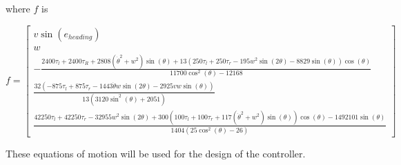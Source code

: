 \documentclass[10pt, letterbox]{article}
\begin{document}
where $f$ is\\
\begin{center}
\begin{equation}
f = 
\begin{bmatrix}v 
\sin{\left(e_{heading} \right)}\\
w\\
- \frac{2400 \tau_{l} + 2400 \tau_{R} + 2808 \left(\dot{\theta}^{2} + w^{2}\right) \sin{\left(\theta \right)} + 13 \left(250 \tau_{l} + 250 \tau_{r} - 195 w^{2} \sin{\left(2 \theta \right)} - 8829 \sin{\left(\theta \right)}\right) \cos{\left(\theta \right)}}{11700 \cos^{2}{\left(\theta \right)} - 12168}\\
\frac{32 \left(- 875 \tau_{l} + 875 \tau_{r} - 1443 \dot{\theta} w \sin{\left(2 \theta \right)} - 2925 v w \sin{\left(\theta \right)}\right)}{13 \left(3120 \sin^{2}{\left(\theta \right)} + 2051\right)}\\
\frac{42250 \tau_{l} + 42250 \tau_{r} - 32955 w^{2} \sin{\left(2 \theta \right)} + 300 \left(100 \tau_{l} + 100 \tau_{r} + 117 \left(\dot{\theta}^{2} + w^{2}\right) \sin{\left(\theta \right)}\right) \cos{\left(\theta \right)} - 1492101 \sin{\left(\theta \right)}}{1404 \left(25 \cos^{2}{\left(\theta \right)} - 26\right)}
\end{bmatrix}
\end{equation}
\end{center}
These equations of motion will be used for the design of the controller.
\end{document}
